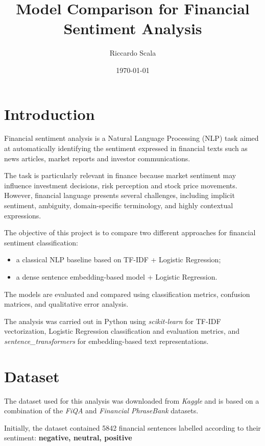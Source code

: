 \documentclass[11pt]{article}
\title{Model Comparison for Financial Sentiment Analysis}
\author{Riccardo Scala}
\date{\today}
\begin{document}
    \maketitle
    \medskip
    \section{Introduction}

    Financial sentiment analysis is a Natural Language Processing (NLP) task aimed at automatically identifying the sentiment expressed in financial texts such as news articles, market reports and investor communications.

    The task is particularly relevant in finance because market sentiment may influence investment decisions, risk perception and stock price movements. However, financial language presents several challenges, including implicit sentiment, ambiguity, domain-specific terminology, and highly contextual expressions.

    The objective of this project is to compare two different approaches for financial sentiment classification:

    \begin{itemize}
        \item a classical NLP baseline based on TF-IDF + Logistic Regression;
        \item a dense sentence embedding-based model + Logistic Regression.
    \end{itemize}

    The models are evaluated and compared using classification metrics, confusion matrices, and qualitative error analysis.

    The analysis was carried out in Python using \textit{scikit-learn} for TF-IDF vectorization, Logistic Regression classification and evaluation metrics, and \textit{sentence\_transformers} for embedding-based text representations.


    \section{Dataset}

    The dataset used for this analysis was downloaded from \textit{Kaggle} and is based on a combination of the \textit{FiQA} and \textit{Financial PhraseBank} datasets.

    Initially, the dataset contained 5842 financial sentences labelled according to their sentiment: \textbf{negative, neutral, positive}
\end{document}
